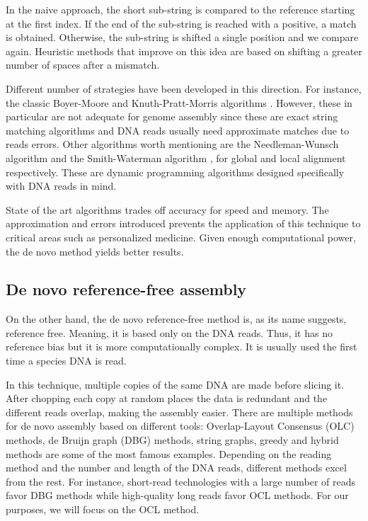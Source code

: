 In the naive approach, the short sub-string is compared to the reference starting at the first index. If the end of the sub-string is reached with a positive, a match is obtained. Otherwise, the sub-string is shifted a single position and we compare again. Heuristic methods that improve on this idea are based on shifting a greater number of spaces after a mismatch.

Different number of strategies have been developed in this direction. For instance, the classic Boyer-Moore and Knuth-Pratt-Morris algorithms \cite{Holmes1999}. However, these in particular are not adequate for genome assembly since these are exact string matching algorithms and DNA reads usually need approximate matches due to reads errors. Other algorithms worth mentioning are the Needleman-Wunsch algorithm \cite{Needleman1970} and the Smith-Waterman algorithm \cite{Smith1981}, for global and local alignment respectively. These are dynamic programming algorithms designed specifically with DNA reads in mind. 

State of the art algorithms trades off accuracy for speed and memory. The approximation and errors introduced prevents the application of this technique to critical areas such as personalized medicine. Given enough computational power, the de novo method yields better results.


\subsection{De novo reference-free assembly}


On the other hand, the de novo reference-free method is, as its name suggests, reference free. Meaning, it is based only on the DNA reads. Thus, it has no reference bias but it is more computationally complex. It is usually used the first time a species DNA is read.

In this technique, multiple copies of the same DNA are made before slicing it. After chopping each copy at random places the data is redundant and the different reads overlap, making the assembly easier. There are multiple methods for de novo assembly based on different tools: Overlap-Layout Consensus (OLC) methods, de Bruijn graph (DBG) methods, string graphs, greedy and hybrid methods are some of the most famous examples. Depending on the reading method and the number and length of the DNA reads, different methods excel from the rest. For instance, short-read technologies with a large number of reads favor DBG methods while high-quality long reads favor OCL methods. For our purposes, we will focus on the OCL method.

